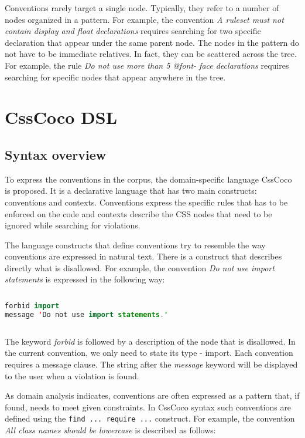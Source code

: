 Conventions rarely target a single node. Typically, they refer to a number of
nodes organized in a pattern. For example, the convention \textit{A ruleset
must not contain display and float declarations} requires searching for two
specific declaration that appear under the same parent node. The nodes in the
pattern do not have to be immediate relatives. In fact, they can be scattered
across the tree. For example, the rule \textit{Do not use more than 5 @font-
face declarations} requires searching for specific nodes that appear anywhere
in the tree.

\section{CssCoco DSL}

\subsection{Syntax overview}

To express the conventions in the corpus, the domain-specific language CssCoco
is proposed. It is a declarative language that has two main constructs:
conventions and contexts. Conventions express the specific rules that has to
be enforced on the code and contexts describe the CSS nodes that need to be
ignored while searching for violations.

The language constructs that define conventions try to resemble the way
conventions are expressed in natural text. There is a construct that describes
directly what is disallowed. For example, the convention \textit{Do not use
import statements} is expressed in the following way:

\begin{sourcecode}
\begin{lstlisting}[style=mono,language=Java]
forbid import
message 'Do not use import statements.'
\end{lstlisting}
\end{sourcecode}

The keyword \textit{forbid} is followed by a description of the node that is
disallowed. In the current convention, we only need to state its type -
import. Each convention requires a message clause. The string after the
\textit{message} keyword will be displayed to the user when a violation is
found.

As domain analysis indicates, conventions are often expressed as a pattern that, if found, needs to
meet given constraints. In CssCoco syntax such conventions are defined using the \texttt{find ...
require ...} construct. For example, the convention \textit{All class names should be lowercase} is
described as follows:


